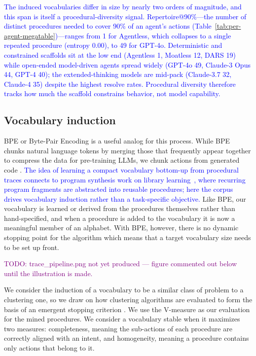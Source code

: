 \documentclass[12pt]{article}
\begin{document}
\textcolor{blue}{The induced vocabularies differ in size by nearly two orders of magnitude, and this span is itself a procedural-diversity signal. Repertoire@90\%---the number of distinct procedures needed to cover 90\% of an agent's actions (Table~\ref{tab:per-agent-megatable})---ranges from 1 for Agentless, which collapses to a single repeated procedure (entropy 0.00), to 49 for GPT-4o. Deterministic and constrained scaffolds sit at the low end (Agentless 1, Moatless 12, DARS 19) while open-ended model-driven agents spread widely (GPT-4o 49, Claude-3 Opus 44, GPT-4 40); the extended-thinking models are mid-pack (Claude-3.7 32, Claude-4 35) despite the highest resolve rates. Procedural diversity therefore tracks how much the scaffold constrains behavior, not model capability.}

\subsection{Vocabulary induction}
\label{sec:vocab}
BPE or Byte-Pair Encoding is a useful analog for this process. While BPE chunks natural language tokens by merging those that frequently appear together to compress the data for pre-training LLMs, we chunk actions from generated code \cite{sennrich2016neuralmachinetranslationrare}. \textcolor{blue}{The idea of learning a compact vocabulary bottom-up from procedural traces connects to program synthesis work on library learning~\cite{ellis2020dreamcodergrowinggeneralizableinterpretable}, where recurring program fragments are abstracted into reusable procedures; here the corpus drives vocabulary induction rather than a task-specific objective.} Like BPE, our vocabulary is learned or derived from the procedures themselves rather than hand-specified, and when a procedure is added to the vocabulary it is now a meaningful member of an alphabet. With BPE, however, there is no dynamic stopping point for the algorithm which means that a target vocabulary size needs to be set up front.

\textcolor{purple}{TODO: trace\_pipeline.png not yet produced --- figure commented out below until the illustration is made.}

We consider the induction of a vocabulary to be a similar class of problem to a clustering one, so we draw on how clustering algorithms are evaluated to form the basis of an emergent stopping criterion \cite{rosenberg-hirschberg-2007-v}. We use the V-measure as our evaluation for the mined procedures. We consider a vocabulary stable when it maximizes two measures: completeness, meaning the sub-actions of each procedure are correctly aligned with an intent, and homogeneity, meaning a procedure contains only actions that belong to it.
\end{document}

